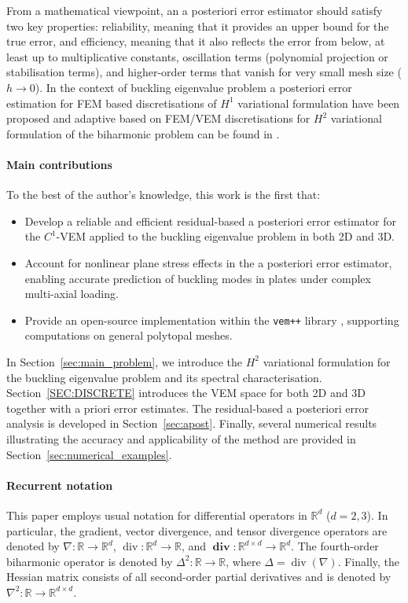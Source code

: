 \documentclass[final,reqno]{elsarticle}
\newcommand\vdiv{\mathop{\mathrm{div}}\nolimits}
\newcommand\bdiv{\mathop{\mathbf{div}}\nolimits}
\begin{document}
From a mathematical viewpoint, an a posteriori error estimator should satisfy two key properties: reliability, meaning that it provides an upper bound for the true error, and efficiency, meaning that it also reflects the error from below, at least up to multiplicative constants, oscillation terms (polynomial projection or stabilisation terms), and higher-order terms that vanish for very small mesh size ($h\rightarrow0$). In the context of buckling eigenvalue problem a posteriori error estimation for FEM based discretisations of $H^1$ variational formulation have been proposed \cite{HLM2015,Stein1994AdaptiveFE} and adaptive based on FEM/VEM discretisations for $H^2$ variational formulation of the biharmonic problem can be found in \cite{CARSTENSEN2024,dassi2025posteriorierrorestimatesc1,feng2023,Li2018,MR4047014}.

\paragraph{Main contributions}
To the best of the author’s knowledge, this work is the first that:
\begin{itemize}
    \item Develop a reliable and efficient residual-based a posteriori error estimator for the $C^1$-VEM applied to the buckling eigenvalue problem in both 2D and 3D.
    \item Account for nonlinear plane stress effects in the a posteriori error estimator, enabling accurate prediction of buckling modes in plates under complex multi-axial loading.
    \item Provide an open-source implementation within the \texttt{vem++} library \cite{dassi2025vem++}, supporting computations on general polytopal meshes.
\end{itemize}

In Section~\ref{sec:main_problem}, we introduce the $H^2$ variational formulation for the buckling eigenvalue problem and its spectral characterisation. Section~\ref{SEC:DISCRETE} introduces the VEM space for both 2D and 3D together with a priori error estimates. The residual-based a posteriori error analysis is developed in Section~\ref{sec:apost}. Finally, several numerical results illustrating the accuracy and applicability of the method are provided in Section~\ref{sec:numerical_examples}.

\paragraph{Recurrent notation} This paper employs usual notation for differential operators in $\mathbb{R}^d$ ($d=2,3$). In particular, the gradient, vector divergence, and tensor divergence operators are denoted by $\nabla:\mathbb{R}\rightarrow \mathbb{R}^d$, $\vdiv:\mathbb{R}^d\rightarrow \mathbb{R}$, and $\bdiv:\mathbb{R}^{d\times d}\rightarrow \mathbb{R}^d$. The fourth-order biharmonic operator is denoted by $\Delta^2: \mathbb{R} \rightarrow \mathbb{R}$, where $\Delta = \vdiv(\nabla)$. Finally, the Hessian matrix consists of all second-order partial derivatives and is denoted by $\nabla^2: \mathbb{R}\rightarrow \mathbb{R}^{d\times d}$. 
\end{document}
